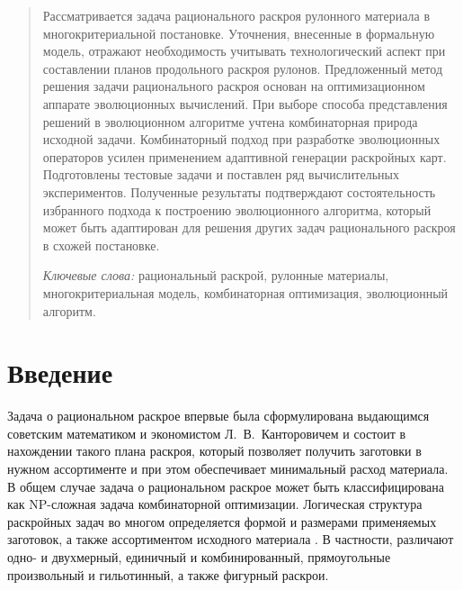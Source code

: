 \documentclass[12pt]{article}
\begin{document}
\begin{abstract}
Рассматривается задача рационального раскроя рулонного материала в 
многокритериальной постановке. Уточнения, внесенные в формальную модель, 
отражают необходимость учитывать технологический аспект при составлении планов 
продольного раскроя рулонов. Предложенный метод решения задачи рационального 
раскроя основан на оптимизационном аппарате эволюционных вычислений. При выборе 
способа представления решений в эволюционном алгоритме учтена комбинаторная 
природа исходной задачи. Комбинаторный подход при разработке эволюционных 
операторов усилен применением адаптивной генерации раскройных карт. 
Подготовлены тестовые задачи и поставлен ряд вычислительных экспериментов. 
Полученные результаты подтверждают состоятельность избранного подхода к 
построению эволюционного алгоритма, который может быть адаптирован для решения 
других задач рационального раскроя в схожей постановке.
\smallskip

\noindent\textit{Ключевые слова:} рациональный раскрой, 
рулонные материалы, многокритериальная модель, комбинаторная оптимизация, 
эволюционный алгоритм.
\end{abstract}    


\section{Введение}

Задача о рациональном раскрое впервые была сформулирована выдающимся советским 
математиком и экономистом Л.~В.~Канторовичем 
\cite{kantorovich39} 
и состоит в нахождении такого плана раскроя, который позволяет получить 
заготовки в нужном ассортименте и при этом обеспечивает минимальный расход 
материала. В общем случае задача о рациональном раскрое может быть 
классифицирована как NP-сложная задача комбинаторной оптимизации. 
Логическая структура раскройных задач во многом определяется формой и размерами 
применяемых заготовок, а также ассортиментом исходного материала 
\cite{wascher07}. 
В частности, различают одно- и двухмерный, единичный и комбинированный, 
прямоугольные произвольный и гильотинный, а также фигурный раскрои.
\end{document}
